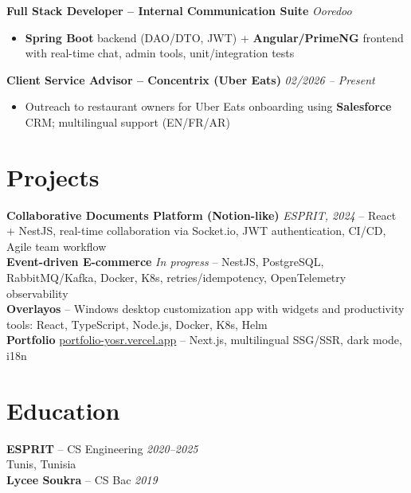 \documentclass[10pt,a4paper]{article}
\begin{document}
{\vspace{2pt}
\textbf{Full Stack Developer -- Internal Communication Suite} \hfill \textit{Ooredoo \;\textbar{}}
\begin{itemize}
  \item \textbf{Spring Boot} backend (DAO/DTO, JWT) + \textbf{Angular/PrimeNG} frontend with real-time chat, admin tools, unit/integration tests
\end{itemize}

\vspace{2pt}
\textbf{Client Service Advisor -- Concentrix (Uber Eats)} \hfill \textit{02/2026 -- Present}
\begin{itemize}
  \item Outreach to restaurant owners for Uber Eats onboarding using \textbf{Salesforce} CRM; multilingual support (EN/FR/AR)
\end{itemize}

}

\section*{Projects}
{\small

\textbf{Collaborative Documents Platform (Notion-like)} \;\textbar\; \textit{ESPRIT, 2024} --
React + NestJS, real-time collaboration via Socket.io, JWT authentication, CI/CD, Agile team workflow\\[2pt]
\textbf{Event-driven E-commerce} \;\textbar\; \textit{In progress} --
NestJS, PostgreSQL, RabbitMQ/Kafka, Docker, K8s, retries/idempotency, OpenTelemetry observability\\[2pt]
\textbf{Overlayos} --
Windows desktop customization app with widgets and productivity tools: React, TypeScript, Node.js, Docker, K8s, Helm\\[2pt]
\textbf{Portfolio} \;\textbar\; \href{https://portfolio-yosr.vercel.app/en}{portfolio-yosr.vercel.app} --
Next.js, multilingual SSG/SSR, dark mode, i18n

}

\section*{Education}
{\footnotesize
\textbf{ESPRIT} -- CS Engineering \hfill \textit{2020--2025}\\
Tunis, Tunisia\\[2pt]
\textbf{Lycee Soukra} -- CS Bac \hfill \textit{2019}
}
\end{document}

